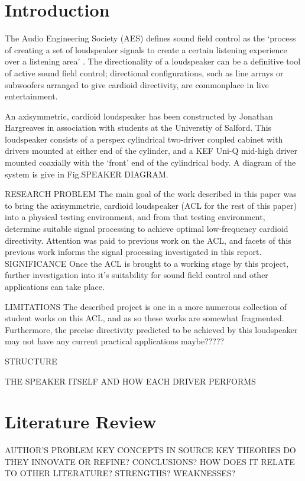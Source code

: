 \documentclass{report}
\begin{document}
\tableofcontents
\newpage

\chapter{Introduction}
    The Audio Engineering Society (AES) defines sound field control as the `process of creating a set of loudspeaker signals to create a certain listening experience over a listening area' \cite{AESsoundfieldcontrol}.
    The directionality of a loudspeaker can be a definitive tool of active sound field control; directional configurations, such as line arrays or subwoofers arranged to give cardioid directivity, are commonplace in live entertainment.

    An axisymmetric, cardioid loudspeaker has been constructed by Jonathan Hargreaves in association with students at the Universtiy of Salford.
    This loudspeaker consists of a perspex cylindrical two-driver coupled cabinet with drivers mounted at either end of the cylinder, and a KEF Uni-Q mid-high driver mounted coaxially with the `front' end of the cylindrical body.
    A diagram of the system is give in Fig.SPEAKER DIAGRAM.


    RESEARCH PROBLEM
    The main goal of the work described in this paper was to bring the axisymmetric, cardioid loudspeaker (ACL for the rest of this paper) into a physical testing environment, and from that testing environment, determine suitable signal processing to achieve optimal low-frequency cardioid directivity.
    Attention was paid to previous work on the ACL, and facets of this previous work informs the signal processing investigated in this report.
    SIGNIFICANCE
    Once the ACL is brought to a working stage by this project, further investigation into it's suitability for sound field control and other applications can take place.

    LIMITATIONS
    The described project is one in a more numerous collection of student works on this ACL, and as so these works are somewhat fragmented.
    Furthermore, the precise directivity predicted to be achieved by this loudspeaker may not have any current practical applications maybe?????

    STRUCTURE

    THE SPEAKER ITSELF AND HOW EACH DRIVER PERFORMS



\chapter{Literature Review}
    AUTHOR'S PROBLEM
    KEY CONCEPTS IN SOURCE
    KEY THEORIES
    DO THEY INNOVATE OR REFINE?
    CONCLUSIONS?
    HOW DOES IT RELATE TO OTHER LITERATURE?
    STRENGTHS?
    WEAKNESSES?
\end{document}
